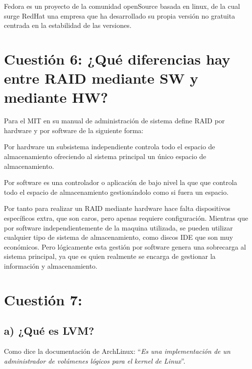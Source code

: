 Fedora\cite{Fedora} es un proyecto de la comunidad openSource basada en linux, de la cual surge RedHat una empresa que ha desarrollado su propia
versión no gratuita centrada en la estabilidad de las versiones.




\section{Cuestión 6: ¿Qué diferencias hay entre RAID mediante SW y mediante HW?}
Para el MIT en su manual de administración de sistema\cite{RaidSfHW} define RAID por hardware y por software de la siguiente forma:

Por hardware un subsistema independiente controla todo el espacio de almacenamiento ofreciendo al sistema principal un único espacio de almacenamiento. 

Por software es una controlador o aplicación de bajo nivel la que que controla todo el espacio de almacenamiento gestionándolo como si fuera
un espacio.

Por tanto para realizar un RAID mediante hardware hace falta dispositivos específicos extra, que son caros, pero apenas requiere configuración.
Mientras que por software independientemente de la maquina utilizada, se pueden utilizar cualquier tipo de sistema de almacenamiento,
como discos IDE que son muy económicos.
Pero lógicamente esta gestión por software genera una sobrecarga al sistema principal, ya que es quien realmente se encarga de gestionar
la información y almacenamiento.


\section{Cuestión 7:}
\subsection{a) ¿Qué es LVM?}
Como dice la documentación de ArchLinux\cite{LVM}: ``\textit{Es una implementación de un administrador de volúmenes lógicos para el kernel de Linux}''.

